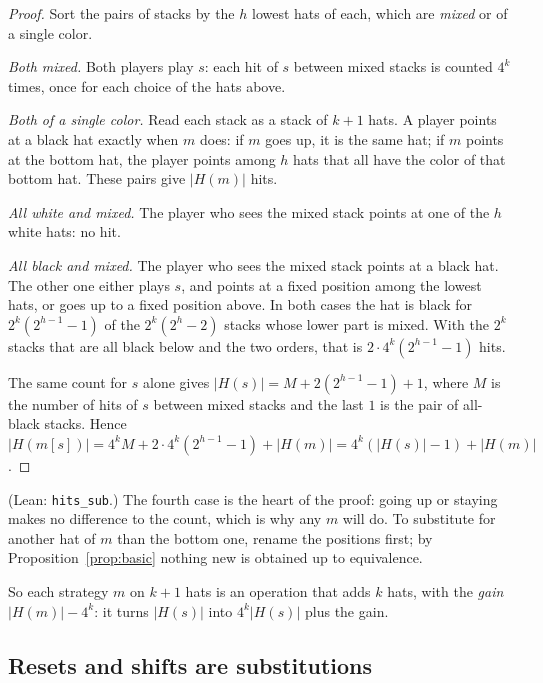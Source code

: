 \documentclass[11pt,a4paper]{article}
\theoremstyle{definition}
\theoremstyle{remark}
\newcommand{\lean}[1]{\texttt{#1}}
\begin{document}
\begin{proof}
Sort the pairs of stacks by the $h$ lowest hats of each, which are
\emph{mixed} or of a single color.

\emph{Both mixed.} Both players play $s$: each hit of $s$ between mixed
stacks is counted $4^k$ times, once for each choice of the hats above.

\emph{Both of a single color.} Read each stack as a stack of $k+1$ hats.
A player points at a black hat exactly when $m$ does: if $m$ goes up, it
is the same hat; if $m$ points at the bottom hat, the player points among
$h$ hats that all have the color of that bottom hat. These pairs give
$|H(m)|$ hits.

\emph{All white and mixed.} The player who sees the mixed stack points at
one of the $h$ white hats: no hit.

\emph{All black and mixed.} The player who sees the mixed stack points at
a black hat. The other one either plays $s$, and points at a fixed
position among the lowest hats, or goes up to a fixed position above. In
both cases the hat is black for $2^k(2^{h-1}-1)$ of the $2^k(2^h-2)$
stacks whose lower part is mixed. With the $2^k$ stacks that are all
black below and the two orders, that is $2\cdot 4^k(2^{h-1}-1)$ hits.

The same count for $s$ alone gives
$|H(s)| = M + 2(2^{h-1}-1) + 1$, where $M$ is the number of hits of $s$
between mixed stacks and the last $1$ is the pair of all-black stacks.
Hence $|H(m[s])| = 4^k M + 2\cdot 4^k(2^{h-1}-1) + |H(m)|
= 4^k(|H(s)|-1) + |H(m)|$.
\end{proof}

(Lean: \lean{hits\_sub}.) The fourth case is the heart of the proof:
going up or staying makes no difference to the count, which is why any
$m$ will do. To substitute for another hat of $m$ than the bottom one,
rename the positions first; by Proposition~\ref{prop:basic} nothing new
is obtained up to equivalence.

So each strategy $m$ on $k+1$ hats is an operation that adds $k$ hats,
with the \emph{gain} $|H(m)| - 4^k$: it turns $|H(s)|$ into
$4^k|H(s)|$ plus the gain.

\subsection{Resets and shifts are substitutions}
\end{document}
